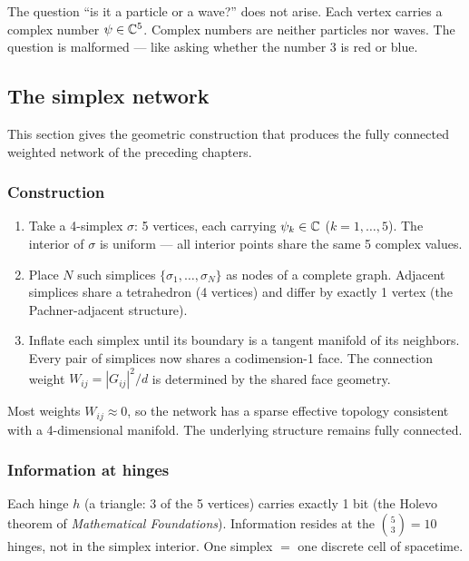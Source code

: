 The question ``is it a particle or a wave?'' does not arise. Each vertex carries a complex number $\psi \in \mathbb{C}^5$. Complex numbers are neither particles nor waves. The question is malformed --- like asking whether the number 3 is red or blue.

\subsection{The simplex network}

This section gives the geometric construction that produces the fully connected weighted network of the preceding chapters.

\subsubsection{Construction}

\begin{enumerate}
\item Take a 4-simplex $\sigma$: 5 vertices, each carrying $\psi_k \in \mathbb{C}$ ($k = 1, \ldots, 5$). The interior of $\sigma$ is uniform --- all interior points share the same 5 complex values.

\item Place $N$ such simplices $\{\sigma_1, \ldots, \sigma_N\}$ as nodes of a complete graph. Adjacent simplices share a tetrahedron (4 vertices) and differ by exactly 1 vertex (the Pachner-adjacent structure).

\item Inflate each simplex until its boundary is a tangent manifold of its neighbors. Every pair of simplices now shares a codimension-1 face. The connection weight $W_{ij} = |G_{ij}|^2/d$ is determined by the shared face geometry.
\end{enumerate}

Most weights $W_{ij} \approx 0$, so the network has a sparse effective topology consistent with a 4-dimensional manifold. The underlying structure remains fully connected.

\subsubsection{Information at hinges}

Each hinge $h$ (a triangle: 3 of the 5 vertices) carries exactly 1 bit (the Holevo theorem of \textit{Mathematical Foundations}). Information resides at the $\binom{5}{3} = 10$ hinges, not in the simplex interior. One simplex $=$ one discrete cell of spacetime.

